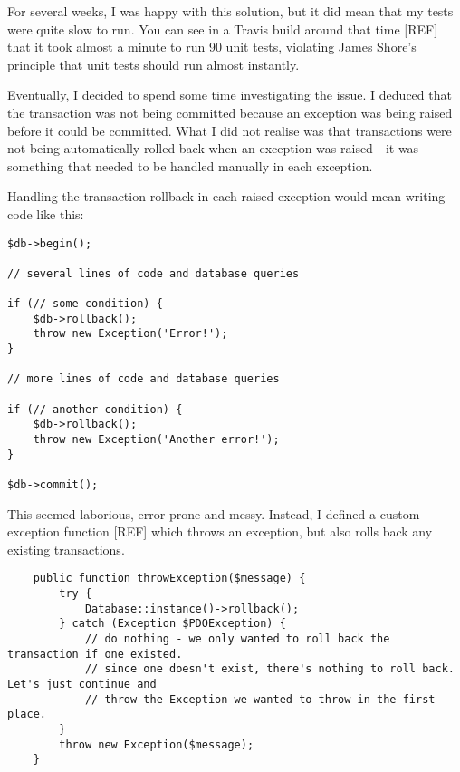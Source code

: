 For several weeks, I was happy with this solution, but it did mean that my tests were quite slow to run. You can see in a Travis build around that time [REF] that it took almost a minute to run 90 unit tests, violating James Shore's principle that unit tests should run almost instantly. %

Eventually, I decided to spend some time investigating the issue. I deduced that the transaction was not being committed because an exception was being raised before it could be committed. What I did not realise was that transactions were not being automatically rolled back when an exception was raised - it was something that needed to be handled manually in each exception.

Handling the transaction rollback in each raised exception would mean writing code like this:

\begin{minipage}{\textwidth}
\begin{lstlisting}
$db->begin();

// several lines of code and database queries

if (// some condition) {
    $db->rollback();
    throw new Exception('Error!');
}

// more lines of code and database queries

if (// another condition) {
    $db->rollback();
    throw new Exception('Another error!');
}

$db->commit();
\end{lstlisting}
\end{minipage}

This seemed laborious, error-prone and messy. Instead, I defined a custom exception function [REF] which throws an exception, but also rolls back any existing transactions. %

\begin{minipage}{\textwidth}
\begin{lstlisting}
    public function throwException($message) {
        try {
            Database::instance()->rollback();
        } catch (Exception $PDOException) {
            // do nothing - we only wanted to roll back the transaction if one existed.
            // since one doesn't exist, there's nothing to roll back. Let's just continue and
            // throw the Exception we wanted to throw in the first place.
        }
        throw new Exception($message);
    }
\end{lstlisting}
\end{minipage}

